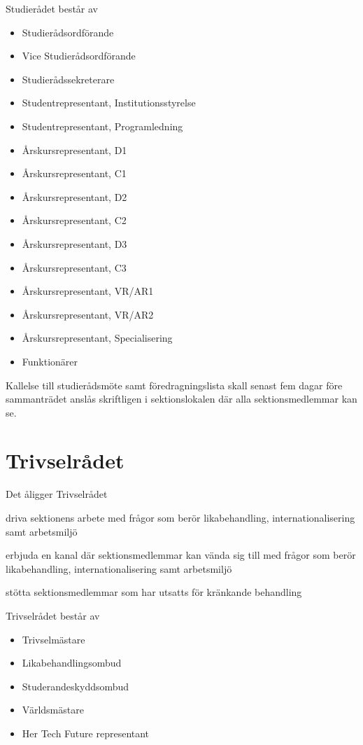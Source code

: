 \documentclass[pdfbookmarks,a4paper,11pt]{article}
\newlength{\itemcollength}
\newenvironment{reglemlista}{%
  \begin{list}{}{%
      \setlength{\labelwidth}{\itemcollength}%
      \setlength{\leftmargin}{\labelwidth + \labelsep}%
      \renewcommand{\makelabel}[1]{%
        \raisebox{0pt}[1ex][0pt]{%
          \makebox[\labelwidth][l]{%
            \parbox[t]{\itemcollength}{%
              \raggedright\hspace{0pt}##1}}}\hfill}%
      }}{%
  \end{list}}
\begin{document}
\begin{reglemlista}
		\item[Sammansättning]
	Studierådet består av
	\begin{itemize}
		\item Studierådsordförande
		\item Vice Studierådsordförande
		\item Studierådssekreterare
		\item Studentrepresentant, Institutionsstyrelse
		\item Studentrepresentant, Programledning
		\item Årskursrepresentant, D1
		\item Årskursrepresentant, C1
		\item Årskursrepresentant, D2
		\item Årskursrepresentant, C2
		\item Årskursrepresentant, D3
		\item Årskursrepresentant, C3
		\item Årskursrepresentant, VR/AR1
		\item Årskursrepresentant, VR/AR2
        \item Årskursrepresentant, Specialisering
		\item Funktionärer
	\end{itemize}

	\item[Kallelse]
	Kallelse till studierådsmöte samt föredragningslista skall senast fem
	dagar före sammanträdet anslås skriftligen i sektionslokalen där alla sektionsmedlemmar kan se.

\end{reglemlista}

\section{Trivselrådet}

\begin{reglemlista}

	\item[Åligganden]
	Det åligger Trivselrådet
	\begin{attlista}
		\item driva sektionens arbete med frågor som berör likabehandling, internationalisering samt arbetsmiljö
		\item erbjuda en kanal där sektionsmedlemmar kan vända sig till med frågor som berör likabehandling, internationalisering samt arbetsmiljö
		\item stötta sektionsmedlemmar som har utsatts för kränkande behandling
	\end{attlista}
	\item[Sammansättning]
	Trivselrådet består av
	\begin{itemize}
		\item Trivselmästare
		\item Likabehandlingsombud
		\item Studerandeskyddsombud
		\item Världsmästare
		\item Her Tech Future representant
	\end{itemize}

\end{reglemlista}
\end{document}

